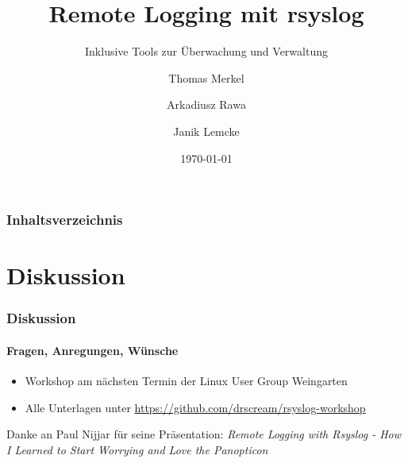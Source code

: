 \documentclass[12pt,a4paper]{beamer}
\title{Remote Logging mit rsyslog}
\subtitle{Inklusive Tools zur Überwachung und Verwaltung}
\author{Thomas Merkel \and Arkadiusz Rawa \and Janik Lemcke}
\institute{Hochschule Ravensburg-Weingarten}
\date{\today}
\begin{document}
	\begin{frame}
		\titlepage
	\end{frame} 
	\begin{frame}
		\frametitle{Inhaltsverzeichnis}
		\tableofcontents[hideallsubsections]
	\end{frame}
	
	
	
	
	

	\section{Diskussion}
	\begin{frame}
		\frametitle{Diskussion}
		\framesubtitle{Fragen, Anregungen, Wünsche}
		\begin{itemize}
			\item Workshop am nächsten Termin der Linux User Group Weingarten
			\item Alle Unterlagen unter \url{https://github.com/drscream/rsyslog-workshop}
		\end{itemize}
		\bigskip
		\bigskip
		\scriptsize{
			Danke an Paul Nijjar für seine Präsentation: \linebreak 
			\textit{Remote Logging with Rsyslog - How I Learned to Start Worrying and Love the Panopticon}
		}
	\end{frame}
\end{document}
